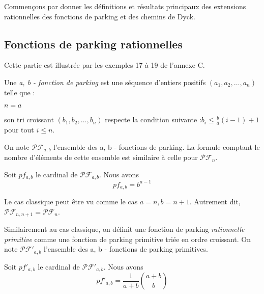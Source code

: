 Commençons par donner les définitions et résultats principaux des extensions
rationnelles des fonctions de parking et des chemins de Dyck.

\subsection{Fonctions de parking rationnelles}

Cette partie est illustrée par les exemples 17 à 19 de l'annexe C.

\begin{definition}
    Une \emph{a, b - fonction de parking} est une séquence d'entiers
    positifs $(a_1, a_2, \ldots, a_n)$ telle que :\\
    \begin{itemize*}
        \item $n = a$\\
        \item son tri croissant $(b_1, b_2, \ldots, b_n)$ respecte la
        condition suivante :$b_i \leqslant \frac{b}{a}(i-1) + 1$ 
        pour tout $i \leqslant n$.
    \end{itemize*}
\end{definition}

On note $\mathcal{PF}_{a,b}$ l'ensemble des a, b - fonctions de parking.
La formule comptant le nombre d'éléments de cette ensemble est similaire
à celle pour $\mathcal{PF}_{n}$.

\begin{theorem}
    Soit $pf_{a,b}$ le cardinal de $\mathcal{PF}_{a,b}$.
    Nous avons $$pf_{a,b} = b^{a-1}$$
\end{theorem}

\begin{rem}
Le cas classique peut être vu comme le cas $a = n, b = n + 1$.
Autrement dit, $\mathcal{PF}_{n, n + 1} = \mathcal{PF}_n$.
\end{rem}

Similairement au cas classique, on définit une fonction de parking
\emph{rationnelle primitive} comme une fonction de parking primitive
triée en ordre croissant.
On note $\mathcal{PF'}_{a,b}$ l'ensemble des a, b - fonctions de parking
primitives.

\begin{theorem}
    Soit $pf'_{a,b}$ le cardinal de $\mathcal{PF'}_{a,b}$.
    Nous avons $$\displaystyle pf'_{a,b} = 
    \frac{1}{a + b} \binom{a + b}{b}$$
\end{theorem}

